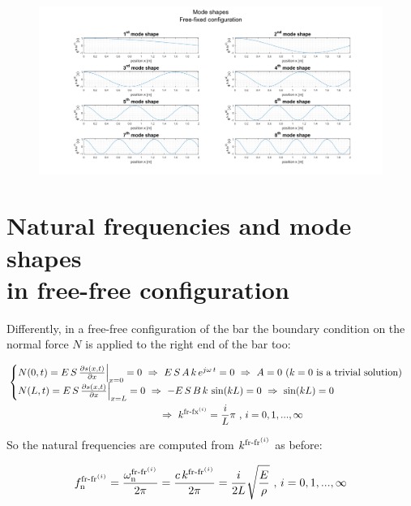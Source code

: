 \documentclass[a4paper,12pt,oneside]{article}
\begin{document}
\begin{figure}[h]
	\hspace{-70pt}
	\includegraphics[scale=0.4]{mode_shapes_free_fixed}
\end{figure}


\section{Natural frequencies and mode shapes \\ in free-free configuration}

Differently, in a free-free configuration of the bar the boundary condition on the normal force $ N $ is applied to the right end of the bar too:

\[ \begin{split}
	& \begin{cases}
			N(0,t) = E \, S \, \frac{\partial s(x,t)}{\partial x}\Big|_{x=0} = 0
				~ \Rightarrow ~ E \, S \, A \, k \, e^{j \omega \, t} = 0
				~ \Rightarrow ~ A = 0 ~ \text{($ k = 0 $ is a trivial solution)} \\
			N(L,t) = E \, S \, \frac{\partial s(x,t)}{\partial x}\Big|_{x=L} = 0
				~ \Rightarrow ~ - E \, S \, B \, k \, \sin(kL) = 0 ~ \Rightarrow ~ \sin(kL) = 0
	\end{cases}	\\
	& \hspace{150pt} ~ \Rightarrow ~
		k^{\textup{fr-fx}^{(i)}} = \frac{i}{L} \pi ~ \text{,} ~ i = 0,1,...,\infty
\end{split} \]

So the natural frequencies are computed from $ k^{\textup{fr-fr}^{(i)}} $ as before:

\[
	f_\textup{n}^{\textup{fr-fr}^{(i)}} =
		\frac{\omega_\textup{n}^{\textup{fr-fr}^{(i)}}}{2 \pi} =
		\frac{c \, k^{\textup{fr-fr}^{(i)}}}{2 \pi} =
		\frac{i}{2L} \sqrt{\frac{E}{\rho}} ~ \text{,} ~ i = 0,1,...,\infty
\]
\end{document}
